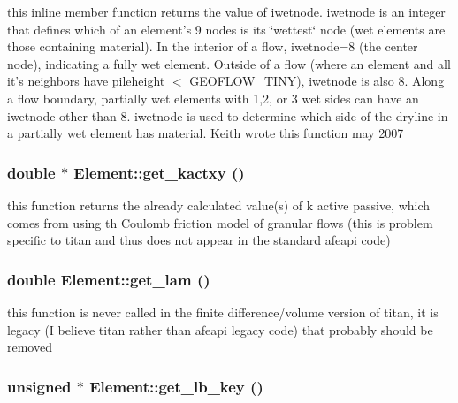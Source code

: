 this inline member function returns the value of iwetnode. iwetnode is an integer that defines which of an element's 9 nodes is its \char`\"{}wettest\char`\"{} node (wet elements are those containing material). In the interior of a flow, iwetnode=8 (the center node), indicating a fully wet element. Outside of a flow (where an element and all it's neighbors have pileheight $<$ GEOFLOW\_\-TINY), iwetnode is also 8. Along a flow boundary, partially wet elements with 1,2, or 3 wet sides can have an iwetnode other than 8. iwetnode is used to determine which side of the dryline in a partially wet element has material. Keith wrote this function may 2007 

\hypertarget{classElement_a86}{
\subsubsection[get\_\-kactxy]{\setlength{\rightskip}{0pt plus 5cm}double $\ast$ Element::get\_\-kactxy ()}}
\label{classElement_a86}


this function returns the already calculated value(s) of k active passive, which comes from using th Coulomb friction model of granular flows (this is problem specific to titan and thus does not appear in the standard afeapi code) 

\hypertarget{classElement_a93}{
\subsubsection[get\_\-lam]{\setlength{\rightskip}{0pt plus 5cm}double Element::get\_\-lam ()}}
\label{classElement_a93}


this function is never called in the finite difference/volume version of titan, it is legacy (I believe titan rather than afeapi legacy code) that probably should be removed 

\hypertarget{classElement_a56}{
\subsubsection[get\_\-lb\_\-key]{\setlength{\rightskip}{0pt plus 5cm}unsigned $\ast$ Element::get\_\-lb\_\-key ()}}
\label{classElement_a56}


